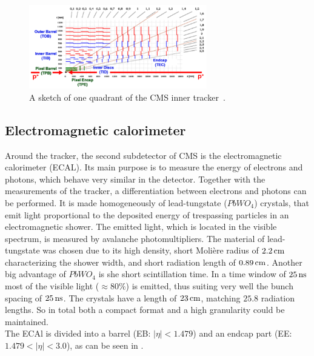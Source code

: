 \begin{figure}[hbtp]
 \centering
 \includegraphics[width=0.69\textwidth]{figures/general/tracker.png}
 \caption{A sketch of one quadrant of the CMS inner tracker~\cite{TrackerPicture}.}
 \label{fig:tracker}
\end{figure}

\subsection{Electromagnetic calorimeter}
Around the tracker, the second subdetector of CMS is the electromagnetic calorimeter (ECAL). Its main purpose is to measure the energy of electrons and photons, which behave very similar in the detector. Together with the measurements of the tracker, a differentiation between electrons and photons can be performed. It is made homogeneously of lead-tungstate ($PbWO_4$) crystals, that emit light proportional to the deposited energy of trespassing particles in an electromagnetic shower. The emitted light, which is located in the visible spectrum, is measured by avalanche photomultipliers. The material of lead-tungstate was chosen due to its high density, short Moli\`{e}re radius of $2.2\,\text{cm}$ characterizing the shower width, and short radiation length of $0.89\,\text{cm}$. Another big advantage of $PbWO_4$ is she short scintillation time. In a time window of $25\,\text{ns}$ most of the visible light ($\approx80\%$) is emitted, thus suiting very well the bunch spacing of $25\,\text{ns}$. The crystals have a length of $23\,\text{cm}$, matching $25.8$ radiation lengths. So in total both a compact format and a high granularity could be maintained.\\
The ECAl is divided into a barrel (EB: $|\eta|<1.479$) and an endcap part (EE: $1.479<|\eta|<3.0$), as can be seen in .
